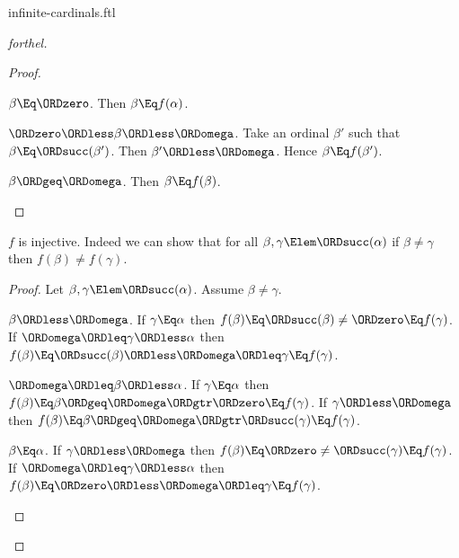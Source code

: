 \documentclass{stex}
\begin{document}
\begin{smodule}{infinite-cardinals.ftl}
\begin{proof}[forthel]
\begin{proof}
    \begin{case}{$\beta \Eq \ORDzero$.}
      Then $\beta \Eq f(\alpha)$.
    \end{case}

    \begin{case}{$\ORDzero \ORDless \beta \ORDless \ORDomega$.}
      Take an ordinal $\beta'$ such that $\beta \Eq \ORDsucc(\beta')$.
      Then $\beta' \ORDless \ORDomega$.
      Hence $\beta \Eq f(\beta')$.
    \end{case}

    \begin{case}{$\beta \ORDgeq \ORDomega$.}
      Then $\beta \Eq f(\beta)$.
    \end{case}
  \end{proof}

  $f$ is injective.
  Indeed we can show that for all $\beta, \gamma \Elem \ORDsucc(\alpha)$ if
  $\beta \neq \gamma$ then $f(\beta) \neq f(\gamma)$.
  \begin{proof}
    Let $\beta, \gamma \Elem \ORDsucc(\alpha)$.
    Assume $\beta \neq \gamma$.

    \begin{case}{$\beta \ORDless \ORDomega$.}
      If $\gamma \Eq \alpha$ then
      $f(\beta)
        \Eq \ORDsucc(\beta)
        \neq \ORDzero
        \Eq f(\gamma)$.
      If $\ORDomega \ORDleq \gamma \ORDless \alpha$ then
      $f(\beta)
        \Eq \ORDsucc(\beta)
        \ORDless \ORDomega
        \ORDleq \gamma
        \Eq f(\gamma)$.
    \end{case}

    \begin{case}{$\ORDomega \ORDleq \beta \ORDless \alpha$.}
      If $\gamma \Eq \alpha$ then
      $f(\beta)
        \Eq \beta
        \ORDgeq \ORDomega
        \ORDgtr \ORDzero
        \Eq f(\gamma)$.
      If $\gamma \ORDless \ORDomega$ then
      $f(\beta)
        \Eq \beta
        \ORDgeq \ORDomega
        \ORDgtr \ORDsucc(\gamma)
        \Eq f(\gamma)$.
    \end{case}

    \begin{case}{$\beta \Eq \alpha$.}
      If $\gamma \ORDless \ORDomega$ then
      $f(\beta)
        \Eq \ORDzero
        \neq \ORDsucc(\gamma)
        \Eq f(\gamma)$.
      If $\ORDomega \ORDleq \gamma \ORDless \alpha$ then
      $f(\beta)
        \Eq \ORDzero
        \ORDless \ORDomega
        \ORDleq \gamma
        \Eq f(\gamma)$.
    \end{case}
  \end{proof}


\end{proof}
\end{smodule}
\end{document}
